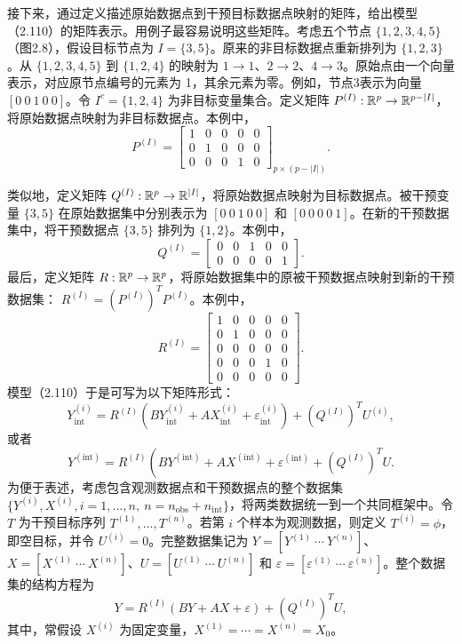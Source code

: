 接下来，通过定义描述原始数据点到干预目标数据点映射的矩阵，给出模型（2.110）的矩阵表示。用例子最容易说明这些矩阵。考虑五个节点 $\{1,2,3,4,5\}$（图2.8），假设目标节点为 $I=\{3,5\}$。原来的非目标数据点重新排列为 $\{1,2,3\}$。从 $\{1,2,3,4,5\}$ 到 $\{1,2,4\}$ 的映射为 $1\to1$、$2\to2$、$4\to3$。原始点由一个向量表示，对应原节点编号的元素为 1，其余元素为零。例如，节点3表示为向量 $[0\ 0\ 1\ 0\ 0]$。令 $I^c=\{1,2,4\}$ 为非目标变量集合。定义矩阵 $P^{(I)}:\mathbb{R}^p\to\mathbb{R}^{p-|I|}$，将原始数据点映射为非目标数据点。本例中，
\[
P^{(I)}=
\begin{bmatrix}
1&0&0&0&0\\0&1&0&0&0\\0&0&0&1&0
\end{bmatrix}_{p\times(p-|I|)}.
\]
\begin{figure}[htbp]
\centering
{}
\end{figure}
类似地，定义矩阵 $Q^{(I)}:\mathbb{R}^p\to\mathbb{R}^{|I|}$，将原始数据点映射为目标数据点。被干预变量 $\{3,5\}$ 在原始数据集中分别表示为 $[0\ 0\ 1\ 0\ 0]$ 和 $[0\ 0\ 0\ 0\ 1]$。在新的干预数据集中，将干预数据点 $\{3,5\}$ 排列为 $\{1,2\}$。本例中，
\[
Q^{(I)}=\begin{bmatrix}0&0&1&0&0\\0&0&0&0&1\end{bmatrix}.
\]
最后，定义矩阵 $R:\mathbb{R}^p\to\mathbb{R}^p$，将原始数据集中的原被干预数据点映射到新的干预数据集：
$R^{(I)}=(P^{(I)})^TP^{(I)}$。本例中，
\[
R^{(I)}=
\begin{bmatrix}
1&0&0&0&0\\0&1&0&0&0\\0&0&0&0&0\\0&0&0&1&0\\0&0&0&0&0
\end{bmatrix}.
\]
模型（2.110）于是可写为以下矩阵形式：
\begin{equation}
Y_{\mathrm{int}}^{(i)}
=R^{(I)}(BY_{\mathrm{int}}^{(i)}+AX_{\mathrm{int}}^{(i)}
+\varepsilon_{\mathrm{int}}^{(i)})
+(Q^{(I)})^TU^{(i)},
\tag{2.114}
\end{equation}
或者
\begin{equation}
Y^{(\mathrm{int})}
=R^{(I)}\left(BY^{(\mathrm{int})}+AX^{(\mathrm{int})}
+\varepsilon^{(\mathrm{int})}+(Q^{(I)})^TU.
\right.
\tag{2.115}
\end{equation}
为便于表述，考虑包含观测数据点和干预数据点的整个数据集 $\{Y^{(i)},X^{(i)},i=1,\ldots,n,\ n=n_{\mathrm{obs}}+n_{\mathrm{int}}\}$，将两类数据统一到一个共同框架中。令 $T$ 为干预目标序列 $T^{(1)},\ldots,T^{(n)}$。若第 $i$ 个样本为观测数据，则定义 $T^{(i)}=\phi$，即空目标，并令 $U^{(i)}=0$。完整数据集记为 $Y=[Y^{(1)}\ \cdots\ Y^{(n)}]$、$X=[X^{(1)}\ \cdots\ X^{(n)}]$、$U=[U^{(1)}\ \cdots\ U^{(n)}]$ 和 $\varepsilon=[\varepsilon^{(1)}\ \cdots\ \varepsilon^{(n)}]$。整个数据集的结构方程为
\begin{equation}
Y=R^{(I)}(BY+AX+\varepsilon)+(Q^{(I)})^TU,
\tag{2.116}
\end{equation}
其中，常假设 $X^{(i)}$ 为固定变量，$X^{(1)}=\cdots=X^{(n)}=X_0$。

